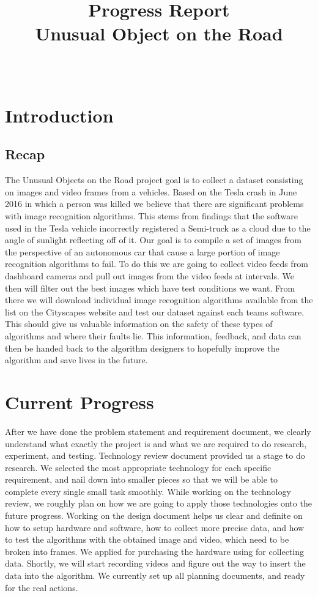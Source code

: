\documentclass[10pt,draftclsnofoot,onecolumn,journal,compsoc]{IEEEtran}
\title{Progress Report \\
Unusual Object on the Road}
\author{
  \IEEEauthorblockN{Team (Group 32) name: Teaching AutoPilot to Dodge\\ Basil Al Zamil, Xilun Guo, and Tanner Fry} \\
  \IEEEauthorblockA{CS 461: Senior Capstone Fall 2016 \\ Oregon State University}
}
\date{}
\begin{document}
    \maketitle
    \IEEEdisplaynontitleabstractindextext
    \IEEEpeerreviewmaketitle

    \newpage
    \tableofcontents
    \newpage
\section{Introduction}
\subsection{Recap}
The Unusual Objects on the Road project goal is to collect a dataset consisting on images and video frames from a vehicles. 
Based on the Tesla crash in June 2016 in which a person was killed we believe that there are significant problems with image recognition algorithms. 
This stems from findings that the software used in the Tesla vehicle incorrectly registered a Semi-truck as a cloud due to the angle of sunlight reflecting off of it. 
Our goal is to compile a set of images from the perspective of an autonomous car that cause a large portion of image recognition algorithms to fail.\newline
To do this we are going to collect video feeds from dashboard cameras and pull out images from the video feeds at intervals. 
We then will filter out the best images which have test conditions we want. From there we will download individual image recognition algorithms available from the list on the Cityscapes website and test our dataset against each teams software. 
This should give us valuable information on the safety of these types of algorithms and where their faults lie. 
This information, feedback, and data can then be handed back to the algorithm designers to hopefully improve the algorithm and save lives in the future.


\section{Current Progress}
After we have done the problem statement and requirement document, we clearly understand what exactly the project is and what we are required to do research, experiment, and testing. 
Technology review document provided us a stage to do research. 
We selected the most appropriate technology for each specific requirement, and nail down into smaller pieces so that we will be able to complete every single small task smoothly. 
While working on the technology review, we roughly plan on how we are going to apply those technologies onto the future progress.
Working on the design document helps us clear and definite on how to setup hardware and software, how to collect more precise data, and how to test the algorithms with the obtained image and video, which need to be broken into frames.
We applied for purchasing the hardware using for collecting data.
Shortly, we will start recording videos and figure out the way to insert the data into the algorithm.
We currently set up all planning documents, and ready for the real actions. 
\end{document}
